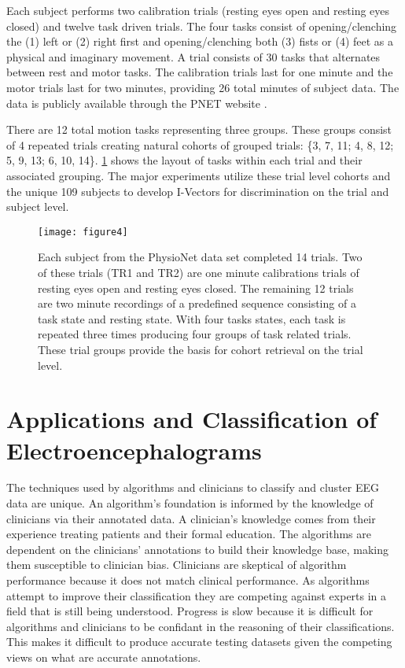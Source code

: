 Each subject performs two calibration trials (resting eyes open and resting eyes closed) and twelve task driven trials. The four tasks consist of opening/clenching the (1) left or (2) right first and opening/clenching both (3) fists or (4) feet as a physical and imaginary movement. A trial consists of 30 tasks that alternates between rest and motor tasks. The calibration trials last for one minute and the motor trials last for two minutes, providing 26 total minutes of subject data. The data is publicly available through the \ac{PNET} website \cite{Goldberger2000}.

There are 12 total motion tasks representing three groups. These groups consist of 4 repeated trials creating natural cohorts of grouped trials: \{3, 7, 11; 4, 8, 12; 5, 9, 13; 6, 10, 14\}. \cref{fig:pNetEx} shows the layout of tasks within each trial and their associated grouping. The major experiments utilize these trial level cohorts and the unique 109 subjects to develop I-Vectors for discrimination on the trial and subject level.

\begin{figure}[ht]
\centering
\texttt{[image: figure4]}
\caption[PhysioNet Trial Composition]{Each subject from the PhysioNet data set completed 14 trials. Two of these trials (TR1 and TR2) are one minute calibrations trials of resting eyes open and resting eyes closed. The remaining 12 trials are two minute recordings of a predefined sequence consisting of a task state and resting state. With four tasks states, each task is repeated three times producing four groups of task related trials. These trial groups provide the basis for cohort retrieval on the trial level.}
\label{fig:pNetEx}
\end{figure}

\section{Applications and Classification of Electroencephalograms}

The techniques used by algorithms and clinicians to classify and cluster \ac{EEG} data are unique. An algorithm's foundation is informed by the knowledge of clinicians via their annotated data. A clinician's knowledge comes from their experience treating patients and their formal education. The algorithms are dependent on the clinicians' annotations to build their knowledge base, making them susceptible to clinician bias. Clinicians are skeptical of algorithm performance because it does not match clinical performance. As algorithms attempt to improve their classification they are competing against experts in a field that is still being understood. Progress is slow because it is difficult for algorithms and clinicians to be confidant in the reasoning of their classifications. This makes it difficult to produce accurate testing datasets given the competing views on what are accurate annotations.

